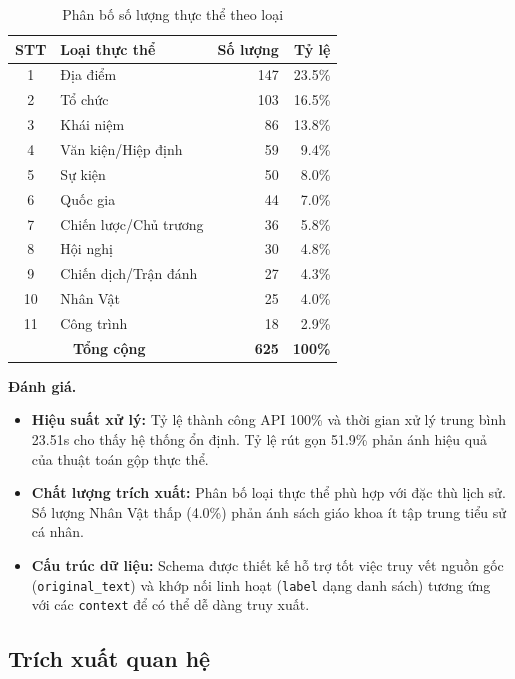 \begin{table}[H]
\centering
\caption{Phân bố số lượng thực thể theo loại}
\begin{tabular}{|c|l|r|r|}
\hline
\textbf{STT} & \textbf{Loại thực thể} & \textbf{Số lượng} & \textbf{Tỷ lệ} \\
\hline
1 & Địa điểm & 147 & 23.5\% \\
2 & Tổ chức & 103 & 16.5\% \\
3 & Khái niệm & 86 & 13.8\% \\
4 & Văn kiện/Hiệp định & 59 & 9.4\% \\
5 & Sự kiện & 50 & 8.0\% \\
6 & Quốc gia & 44 & 7.0\% \\
7 & Chiến lược/Chủ trương & 36 & 5.8\% \\
8 & Hội nghị & 30 & 4.8\% \\
9 & Chiến dịch/Trận đánh & 27 & 4.3\% \\
10 & Nhân Vật & 25 & 4.0\% \\
11 & Công trình & 18 & 2.9\% \\
\hline
\multicolumn{2}{|c|}{\textbf{Tổng cộng}} & \textbf{625} & \textbf{100\%} \\
\hline
\end{tabular}
\label{tab:entity_distribution}
\end{table}

\noindent \textbf{Đánh giá.}
\begin{itemize}
    \item \textbf{Hiệu suất xử lý:} Tỷ lệ thành công API 100\% và thời gian xử lý trung bình 23.51s cho thấy hệ thống ổn định. Tỷ lệ rút gọn 51.9\% phản ánh hiệu quả của thuật toán gộp thực thể.
    \item \textbf{Chất lượng trích xuất:} Phân bố loại thực thể phù hợp với đặc thù lịch sử. Số lượng Nhân Vật thấp (4.0\%) phản ánh sách giáo khoa ít tập trung tiểu sử cá nhân.
    \item \textbf{Cấu trúc dữ liệu:} Schema được thiết kế hỗ trợ tốt việc truy vết nguồn gốc (\texttt{original\_text}) và khớp nối linh hoạt (\texttt{label} dạng danh sách) tương ứng với các \texttt{context} để có thể dễ dàng truy xuất.
\end{itemize}

\subsection{Trích xuất quan hệ}
\label{subsec:relationship_extraction}

